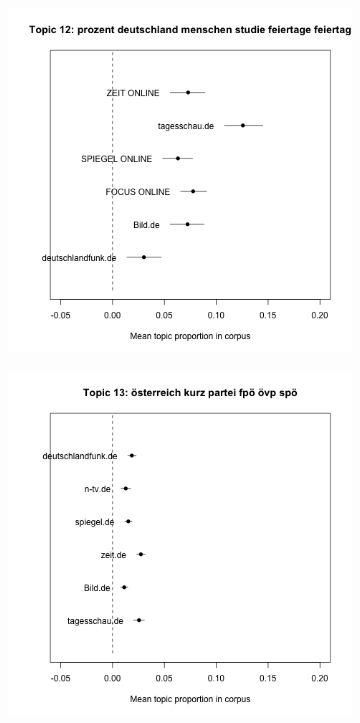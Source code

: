 \documentclass[12pt,a4paper,notitlepage]{article}
\begin{document}
\begin{figure}[H]
\begin{center}
\begin{subfigure}[normla]{0.2\textwidth}
		\end{subfigure}
		\begin{subfigure}[normla]{0.2\textwidth}
			\includegraphics[width=\textwidth]{../figs/estimate_effect12.png}
		\end{subfigure}
		\begin{subfigure}[normla]{0.2\textwidth}
			\includegraphics[width=\textwidth]{../figs/estimate_effect13.png}

\end{subfigure}
\end{center}
\end{figure}
\end{document}
